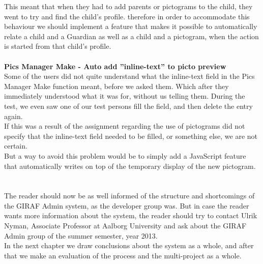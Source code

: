 This meant that when they had to add parents or pictograms to the child, they went to try and find the child's profile. therefore in order to accommodate this behaviour we should implement a feature that makes it possible to automatically relate a child and a Guardian as well as a child and a pictogram, when the action is started from that child's profile.\\
\\
\textbf{Pics Manager Make - Auto add ''inline-text'' to picto preview}\\
Some of the users did not quite understand what the inline-text field in the Pics Manager Make function meant, before we asked them. Which after they immediately understood what it was for, without us telling them. During the test, we even saw one of our test persons fill the field, and then delete the entry again.\\
If this was a result of the assignment regarding the use of pictograms did not specify that the inline-text field needed to be filled, or something else, we are not certain.\\
But a way to avoid this problem would be to simply add a JavaScript feature that automatically writes on top of the temporary display of the new pictogram.\\
\\
\\
The reader should now be as well informed of the structure and shortcomings of the GIRAF Admin system, as the developer group was. But in case the reader wants more information about the system, the reader should try to contact Ulrik Nyman, Associate Professor at Aalborg University and ask about the GIRAF Admin group of the summer semester, year 2013.\\
In the next chapter we draw conclusions about the system as a whole, and after that we make an evaluation of the process and the multi-project as a whole.


